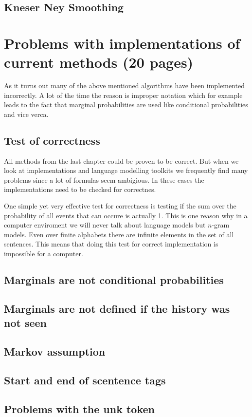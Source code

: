 \documentclass[•]{book}
\begin{document}
\section{Kneser Ney Smoothing}

\chapter{Problems with implementations of current methods (20 pages)}
As it turns out many of the above mentioned algorithms have been implemented incorrectly. 
A lot of the time the reason is improper notation which for example leads to the fact that marginal probabilities are used like conditional probabilities and vice verca. 

\section{Test of correctness}
All methods from the last chapter could be proven to be correct.
But when we look at implementations and language modelling toolkits we frequently find many problems since a lot of formulas seem ambigious. 
In these cases the implementations need to be checked for correctnes. 

One simple yet very effective test for correctness is testing if the sum over the probability of all events that can occure is actually 1. 
This is one reason why in a computer enviroment we will never talk about language models but $n$-gram models. 
Even over finite alphabets there are infinite elements in the set of all sentences. 
This means that doing this test for correct implementation is impossible for a computer.
\section{Marginals are not conditional probabilities}
\section{Marginals are not defined if the history was not seen}
\section{Markov assumption}
\section{Start and end of scentence tags}
\section{Problems with the unk token}
\end{document}
